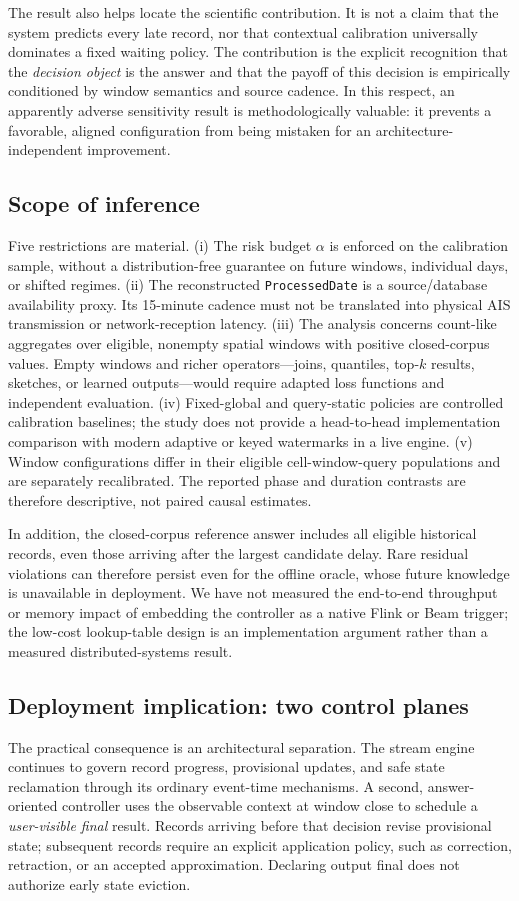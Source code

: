 \documentclass[conference]{IEEEtran}
\begin{document}
The result also helps locate the scientific contribution. It is not a claim that the system predicts every late record, nor that contextual calibration universally dominates a fixed waiting policy. The contribution is the explicit recognition that the \emph{decision object} is the answer and that the payoff of this decision is empirically conditioned by window semantics and source cadence. In this respect, an apparently adverse sensitivity result is methodologically valuable: it prevents a favorable, aligned configuration from being mistaken for an architecture-independent improvement.

\subsection{Scope of inference}
Five restrictions are material. (i) The risk budget $\alpha$ is enforced on the calibration sample, without a distribution-free guarantee on future windows, individual days, or shifted regimes. (ii) The reconstructed \texttt{ProcessedDate} is a source/database availability proxy. Its 15-minute cadence must not be translated into physical AIS transmission or network-reception latency. (iii) The analysis concerns count-like aggregates over eligible, nonempty spatial windows with positive closed-corpus values. Empty windows and richer operators---joins, quantiles, top-$k$ results, sketches, or learned outputs---would require adapted loss functions and independent evaluation. (iv) Fixed-global and query-static policies are controlled calibration baselines; the study does not provide a head-to-head implementation comparison with modern adaptive or keyed watermarks in a live engine. (v) Window configurations differ in their eligible cell-window-query populations and are separately recalibrated. The reported phase and duration contrasts are therefore descriptive, not paired causal estimates.

In addition, the closed-corpus reference answer includes all eligible historical records, even those arriving after the largest candidate delay. Rare residual violations can therefore persist even for the offline oracle, whose future knowledge is unavailable in deployment. We have not measured the end-to-end throughput or memory impact of embedding the controller as a native Flink or Beam trigger; the low-cost lookup-table design is an implementation argument rather than a measured distributed-systems result.

\subsection{Deployment implication: two control planes}
The practical consequence is an architectural separation. The stream engine continues to govern record progress, provisional updates, and safe state reclamation through its ordinary event-time mechanisms. A second, answer-oriented controller uses the observable context at window close to schedule a \emph{user-visible final} result. Records arriving before that decision revise provisional state; subsequent records require an explicit application policy, such as correction, retraction, or an accepted approximation. Declaring output final does not authorize early state eviction.
\end{document}
